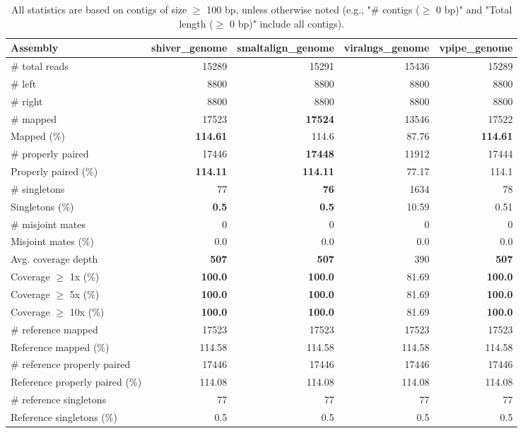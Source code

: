 \documentclass[12pt,a4paper]{article}
\begin{document}
\begin{table}[ht]
\begin{center}
\caption{All statistics are based on contigs of size $\geq$ 100 bp, unless otherwise noted (e.g., "\# contigs ($\geq$ 0 bp)" and "Total length ($\geq$ 0 bp)" include all contigs).}
\begin{tabular}{|l*{4}{|r}|}
\hline
Assembly & shiver\_genome & smaltalign\_genome & viralngs\_genome & vpipe\_genome \\ \hline
\# total reads & 15289 & 15291 & 15436 & 15289 \\ \hline
\# left & 8800 & 8800 & 8800 & 8800 \\ \hline
\# right & 8800 & 8800 & 8800 & 8800 \\ \hline
\# mapped & 17523 & {\bf 17524} & 13546 & 17522 \\ \hline
Mapped (\%) & {\bf 114.61} & 114.6 & 87.76 & {\bf 114.61} \\ \hline
\# properly paired & 17446 & {\bf 17448} & 11912 & 17444 \\ \hline
Properly paired (\%) & {\bf 114.11} & {\bf 114.11} & 77.17 & 114.1 \\ \hline
\# singletons & 77 & {\bf 76} & 1634 & 78 \\ \hline
Singletons (\%) & {\bf 0.5} & {\bf 0.5} & 10.59 & 0.51 \\ \hline
\# misjoint mates & 0 & 0 & 0 & 0 \\ \hline
Misjoint mates (\%) & 0.0 & 0.0 & 0.0 & 0.0 \\ \hline
Avg. coverage depth & {\bf 507} & {\bf 507} & 390 & {\bf 507} \\ \hline
Coverage $\geq$ 1x (\%) & {\bf 100.0} & {\bf 100.0} & 81.69 & {\bf 100.0} \\ \hline
Coverage $\geq$ 5x (\%) & {\bf 100.0} & {\bf 100.0} & 81.69 & {\bf 100.0} \\ \hline
Coverage $\geq$ 10x (\%) & {\bf 100.0} & {\bf 100.0} & 81.69 & {\bf 100.0} \\ \hline
\# reference mapped & 17523 & 17523 & 17523 & 17523 \\ \hline
Reference mapped (\%) & 114.58 & 114.58 & 114.58 & 114.58 \\ \hline
\# reference properly paired & 17446 & 17446 & 17446 & 17446 \\ \hline
Reference properly paired (\%) & 114.08 & 114.08 & 114.08 & 114.08 \\ \hline
\# reference singletons & 77 & 77 & 77 & 77 \\ \hline
Reference singletons (\%) & 0.5 & 0.5 & 0.5 & 0.5 \\ \hline

\end{tabular}
\end{center}
\end{table}
\end{document}
